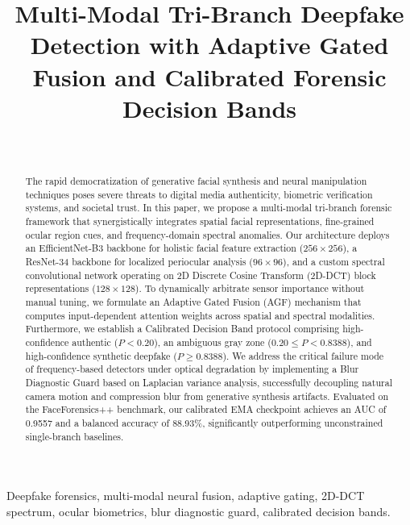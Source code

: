 \documentclass[journal,10pt,twocolumn]{IEEEtran}
\begin{document}
\title{Multi-Modal Tri-Branch Deepfake Detection with Adaptive Gated Fusion and Calibrated Forensic Decision Bands}

\author{
    \\
}

\maketitle

\begin{abstract}
The rapid democratization of generative facial synthesis and neural manipulation techniques poses severe threats to digital media authenticity, biometric verification systems, and societal trust. In this paper, we propose a multi-modal tri-branch forensic framework that synergistically integrates spatial facial representations, fine-grained ocular region cues, and frequency-domain spectral anomalies. Our architecture deploys an EfficientNet-B3 backbone for holistic facial feature extraction ($256\times256$), a ResNet-34 backbone for localized periocular analysis ($96\times96$), and a custom spectral convolutional network operating on 2D Discrete Cosine Transform (2D-DCT) block representations ($128\times128$). To dynamically arbitrate sensor importance without manual tuning, we formulate an Adaptive Gated Fusion (AGF) mechanism that computes input-dependent attention weights across spatial and spectral modalities. Furthermore, we establish a Calibrated Decision Band protocol comprising high-confidence authentic ($P < 0.20$), an ambiguous gray zone ($0.20 \le P < 0.8388$), and high-confidence synthetic deepfake ($P \ge 0.8388$). We address the critical failure mode of frequency-based detectors under optical degradation by implementing a Blur Diagnostic Guard based on Laplacian variance analysis, successfully decoupling natural camera motion and compression blur from generative synthesis artifacts. Evaluated on the FaceForensics++ benchmark, our calibrated EMA checkpoint achieves an AUC of 0.9557 and a balanced accuracy of 88.93\%, significantly outperforming unconstrained single-branch baselines.
\end{abstract}

\begin{IEEEkeywords}
Deepfake forensics, multi-modal neural fusion, adaptive gating, 2D-DCT spectrum, ocular biometrics, blur diagnostic guard, calibrated decision bands.
\end{IEEEkeywords}
\end{document}
